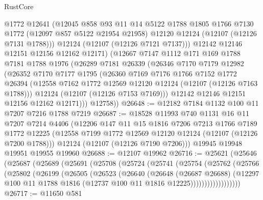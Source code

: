 \begin{lexlean}{RustCore}
\begin{coremodule}
          @1772
          @12641
          (@12045
            @858
            @93
            @11
            @14
            @5122
            @1788
            @1805
            @1766
            @7130
            @1772
            (@12097 @857 @5122 @21954 @21958)
            @12120
            @12124
            (@12107 (@12126 @7131 @1788)))
          @12124
          (@12107 (@12126 @7121 @7137)))
        @12142
        @12146
        @12151
        @12156
        @12162
        @12171)
      (@12667
        @7147
        @1112
        @171
        @169
        @1788
        @7181
        @1788
        @1976
        (@26289
          @7181
          @26339
          (@26346
            @7170
            @7179
            @12982
            (@26352
              @7170
              @7177
              @1795
              (@26360
                @7169
                @7176
                @1766
                @7152
                @1772
                @26394
                (@12558 @7162 @1772 @12569 @12120 @12124 (@12107 (@12126 @7163 @1788)))
                @12124
                (@12107 (@12126 @7153 @7169)))
              @12142
              @12146
              @12151
              @12156
              @12162
              @12171)))
        @12758))
@26648 := @12182 @7184 @1132 @100 @11 @7207 @7216 @1788 @7219
@26687 := @18528
    @11993
    @740
    @1131
    @16
    @11
    @7207
    @7214
    @4406
    (@12206
      @147
      @11
      @15
      @1816
      @7206
      @7213
      @1766
      @7189
      @1772
      @12225
      (@12558 @7199 @1772 @12569 @12120 @12124 (@12107 (@12126 @7200 @1788)))
      @12124
      (@12107 (@12126 @7190 @7206)))
    @19945
    @19948
    @19951
    @19955
    @19960
@26688 := @12107 @19962
@26716 := @25621
    (@25646
      (@25687
        (@25689
          (@25691
            (@25708
              (@25724
                (@25741
                  (@25754
                    (@25762
                      (@25766
                        (@25802
                          (@26199
                            (@26505
                              (@26523
                                (@26640
                                  (@26648
                                    (@26687 @26688)
                                    (@12297
                                      @100
                                      @11
                                      @1788
                                      @1816
                                      (@12737 @100 @11 @1816 @12225))))))))))))))))))
@26717 := @11650 @581

\end{coremodule}
\end{lexlean}
